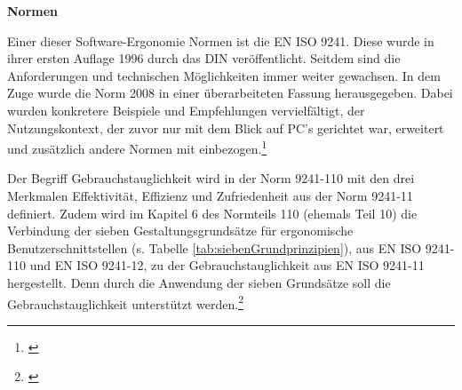 \textbf{Normen}

Einer dieser Software-Ergonomie Normen ist die \gls{EN} \gls{ISO} 9241. Diese wurde in ihrer ersten Auflage 1996 durch das \gls{DIN} veröffentlicht. Seitdem sind die Anforderungen und technischen Möglichkeiten immer weiter gewachsen. In dem Zuge wurde die Norm 2008 in einer überarbeiteten Fassung herausgegeben. Dabei wurden konkretere Beispiele und Empfehlungen vervielfältigt, der Nutzungskontext, der zuvor nur mit dem Blick auf PC's gerichtet war, erweitert und zusätzlich andere Normen mit einbezogen.\footnote{\cite[vgl.][]{Schneider2008}}

Der Begriff Gebrauchstauglichkeit wird in der Norm 9241-110 mit den drei Merkmalen Effektivität, Effizienz und Zufriedenheit aus der Norm 9241-11 definiert. Zudem wird im Kapitel 6 des Normteils 110 (ehemals Teil 10) die Verbindung der sieben Gestaltungsgrundsätze für ergonomische Benutzerschnittstellen (s. Tabelle \ref{tab:siebenGrundprinzipien}), aus EN ISO 9241-110 und EN ISO 9241-12, zu der Gebrauchstauglichkeit aus EN ISO 9241-11 hergestellt. Denn durch die Anwendung der sieben Grundsätze soll die Gebrauchstauglichkeit unterstützt werden.\footnote{\cite[vgl.][Kap. 6]{ISO9241-110}}


